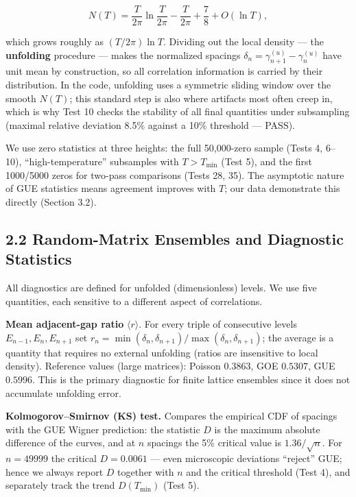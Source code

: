 \documentclass[
]{article}
\begin{document}
\[N(T) = \frac{T}{2\pi}\ln\frac{T}{2\pi} - \frac{T}{2\pi} + \frac{7}{8} + O(\ln T),\]

which grows roughly as \((T/2\pi)\ln T\). Dividing out the local density
--- the \textbf{unfolding} procedure --- makes the normalized spacings
\(\delta_n = \gamma_{n+1}^{(u)} - \gamma_n^{(u)}\) have unit mean by
construction, so all correlation information is carried by their
distribution. In the code, unfolding uses a symmetric sliding window
over the smooth \(N(T)\); this standard step is also where artifacts
most often creep in, which is why Test 10 checks the stability of all
final quantities under subsampling (maximal relative deviation 8.5\%
against a 10\% threshold --- PASS).

We use zero statistics at three heights: the full 50,000-zero sample
(Tests 4, 6--10), ``high-temperature'' subsamples with \(T>T_{\min}\)
(Test 5), and the first 1000/5000 zeros for two-pass comparisons (Tests
28, 35). The asymptotic nature of GUE statistics means agreement
improves with \(T\); our data demonstrate this directly (Section 3.2).

\subsection{2.2 Random-Matrix Ensembles and Diagnostic
Statistics}\label{random-matrix-ensembles-and-diagnostic-statistics}

All diagnostics are defined for unfolded (dimensionless) levels. We use
five quantities, each sensitive to a different aspect of correlations.

\textbf{Mean adjacent-gap ratio} \(\langle r\rangle\). For every triple
of consecutive levels \(E_{n-1},E_n,E_{n+1}\) set
\(r_n = \min(\delta_n,\delta_{n+1})/\max(\delta_n,\delta_{n+1})\); the
average is a quantity that requires no external unfolding (ratios are
insensitive to local density). Reference values (large matrices):
Poisson \(0.3863\), GOE \(0.5307\), GUE \(0.5996\). This is the primary
diagnostic for finite lattice ensembles since it does not accumulate
unfolding error.

\textbf{Kolmogorov--Smirnov (KS) test.} Compares the empirical CDF of
spacings with the GUE Wigner prediction: the statistic \(D\) is the
maximum absolute difference of the curves, and at \(n\) spacings the 5\%
critical value is \(1.36/\sqrt{n}\). For \(n = 49999\) the critical
\(D = 0.0061\) --- even microscopic deviations ``reject'' GUE; hence we
always report \(D\) together with \(n\) and the critical threshold (Test
4), and separately track the trend \(D(T_{\min})\) (Test 5).
\end{document}
